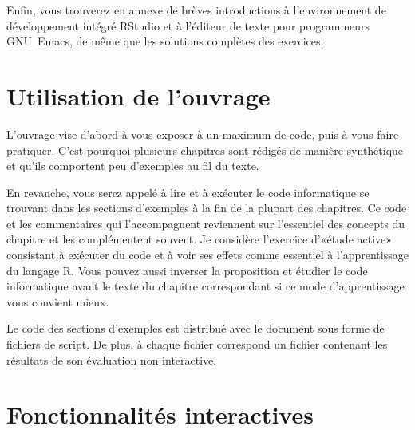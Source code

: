 Enfin, vous trouverez en annexe de brèves introductions à
l'environnement de développement intégré RStudio et à l'éditeur de
texte pour programmeurs GNU~Emacs, de même que les solutions complètes
des exercices.

\section*{Utilisation de l'ouvrage}

L'ouvrage vise d'abord à vous exposer à un maximum de code, puis à
vous faire pratiquer. C'est pourquoi plusieurs chapitres sont rédigés
de manière synthétique et qu'ils comportent peu d'exemples au fil du
texte.

En revanche, vous serez appelé à lire et à exécuter le code
informatique se trouvant dans les sections d'exemples à la fin de la
plupart des chapitres. Ce code et les commentaires qui l'accompagnent
reviennent sur l'essentiel des concepts du chapitre et les
complémentent souvent. Je considère l'exercice d'«étude active»
consistant à exécuter du code et à voir ses effets comme essentiel à
l'apprentissage du langage R. Vous pouvez aussi inverser la
proposition et étudier le code informatique avant le texte du chapitre
correspondant si ce mode d'apprentissage vous convient mieux.

Le code des sections d'exemples est distribué avec le document sous
forme de fichiers de script. De plus, à chaque fichier 
correspond un fichier  contenant les résultats de son
évaluation non interactive.


\section*{Fonctionnalités interactives}

